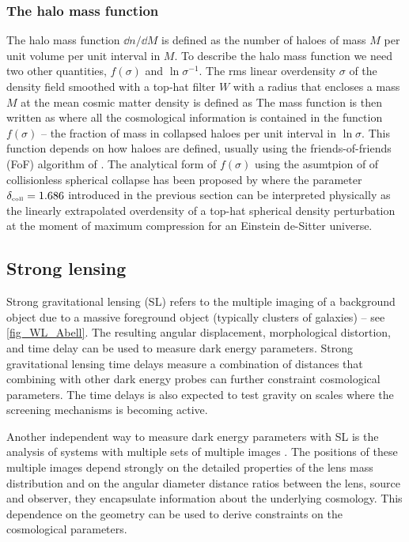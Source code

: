 \subsubsection{The halo mass function}
The halo mass function $\dd n/\dd M$ is defined as the number of haloes of mass $M$ per unit volume per unit interval in $M$. To describe the halo mass function we need two other quantities, $f(\sigma)$ and $\ln\sigma^{-1}$. The rms linear overdensity $\sigma$ of the density field smoothed with a top-hat filter $W$ with a radius that encloses a mass $M$ at the mean cosmic matter density is defined as
The mass function is then written as
where all the cosmological information is contained in the function \(f(\sigma)\) --  the fraction of mass in collapsed haloes per unit interval in $\ln\sigma$. This function depends on how haloes are defined, usually using the friends-of-friends (FoF) algorithm of \textcite{1985ApJ...292..371D}. The analytical form of $f(\sigma)$ using the asumtpion of of collisionless spherical collapse has been proposed by \textcite{1974ApJ...187..425P}
where the parameter \(\delta_\text{\tiny coll}=1.686\) introduced in the previous section can be interpreted physically as the linearly extrapolated overdensity of a top-hat spherical density perturbation at the moment of maximum compression for an Einstein de-Sitter universe.
\subsection{Strong lensing}
Strong gravitational lensing (SL) refers to the multiple imaging of a background object due to a massive foreground object (typically clusters of galaxies) -- see \autoref{fig_WL_Abell}. The resulting angular displacement, morphological distortion, and time delay can be used to measure dark energy parameters. Strong gravitational lensing time delays measure a combination of distances that combining with other dark energy probes can further constraint cosmological parameters. The time delays is also expected to test gravity on scales where the screening mechanisms is becoming active.

Another independent way to measure dark energy parameters with SL is the analysis of systems with multiple sets of multiple images \textcite{SL_in_CLGs}. The positions of these multiple images depend strongly on the detailed properties of the lens mass distribution and on the angular diameter distance ratios between the lens, source and observer, they encapsulate information about the underlying cosmology. This dependence on the geometry can be used to derive constraints on the cosmological parameters.
